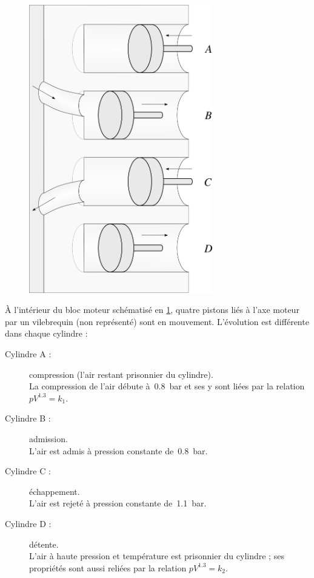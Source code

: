 	\begin{figure}
		\begin{center}
			\includegraphics[width=8cm]{images/quatre_cylindres.png}
		\end{center}
		\label{fig_quatre_cylindres}
	\end{figure}
	
	À l’intérieur du bloc moteur schématisé en \cref{fig_quatre_cylindres}, quatre pistons liés à l’axe moteur par un vilebrequin (non représenté) sont en mouvement. L’évolution est différente dans chaque cylindre :
	
	\begin{description}
		\item [Cylindre A :] {compression (l’air restant prisonnier du cylindre).\nopagebreak\\
									La compression de l’air débute à~\SI{0,8}{\bar} et ses y sont liées par la relation $p V^{\num{1,3}} = k_1$.}
		\item [Cylindre B :] {admission.\\
									L’air est admis à pression constante de~\SI{0,8}{\bar}.}
		\item [Cylindre C :] {échappement.\\
									L’air est rejeté à pression constante de~\SI{1,1}{\bar}.}
		\item [Cylindre D :] {détente.\\
									L’air à haute pression et température est prisonnier du cylindre ; ses propriétés sont aussi reliées par la relation $p V^{\num{1,3}} = k_2$.}
	\end{description}
		
